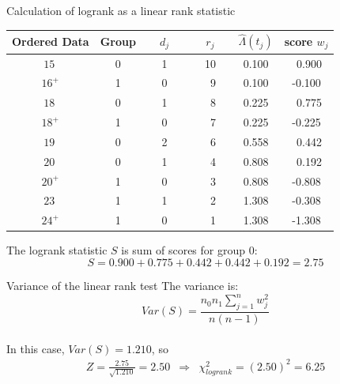 \documentclass[envcountsect, 10pt, portrait, palatino]{beamer}
\begin{document}
\begin{frame}{Calculation of logrank as a linear rank statistic}
\begin{center}
\begin{tabular}{cccccc}
\hline
Ordered Data & Group & ~~$d_j$~~ & ~~$r_j$~~ &  $\hat\Lambda(t_j)$ & score $w_j$  \\
\hline
$15~$     &   0   &     1   &   10  &  0.100   & ~0.900 \\
$16^+$    &   1   &     0   &   ~9  &  0.100   & -0.100 \\
$18~$     &   0   &     1   &   ~8  &  0.225   & ~0.775 \\
$18^+$    &   1   &     0   &   ~7  &  0.225   & -0.225 \\
$19~$     &   0   &     2   &   ~6  &  0.558   & ~0.442 \\
$20~$     &   0   &     1   &   ~4  &  0.808   & ~0.192 \\
$20^+$    &   1   &     0   &   ~3  &  0.808   & -0.808 \\
$23~$     &   1   &     1   &   ~2  &  1.308   & -0.308 \\
$24^+$    &   1   &     0   &   ~1  &  1.308   & -1.308 \\ \hline
\end{tabular}
\end{center}

The logrank statistic $S$ is sum of scores for group 0:
\[ S = 0.900 + 0.775 + 0.442 + 0.442 + 0.192=2.75\]
\end{frame}
\begin{frame}{Variance of the linear rank test}
The variance is:
\[ Var(S) = \frac{n_0 n_1 \sum_{j=1}^{n} w_j^2 }{n(n-1)} \]
\\[2ex]
In this case,  $Var(S)= 1.210$, so
\begin{eqnarray*}
Z = \frac{2.75}{\sqrt{1.210}} = 2.50
& \Longrightarrow & \chi^2_{logrank} = (2.50)^2 = 6.25
\end{eqnarray*}
\end{frame}
\end{document}
